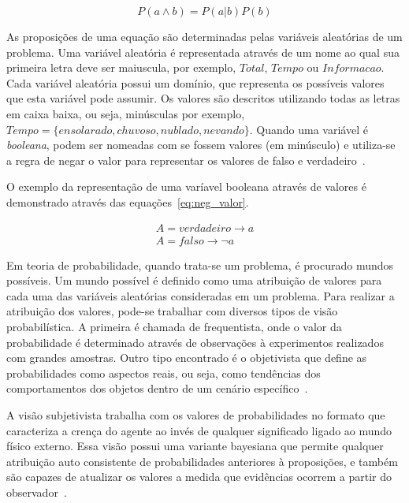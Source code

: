 \begin{equation}
    \label{eq:prob_condicional_a_b_2}
    P(a \land b) = P(a|b)P(b)
\end{equation}

As proposições de uma equação são determinadas pelas variáveis aleatórias de um problema. Uma variável aleatória é representada através de um nome ao qual sua primeira letra deve ser maiuscula, por exemplo, $Total$, $Tempo$ ou $Informacao$. Cada variável aleatória possui um domínio, que representa os possíveis valores que esta variável pode assumir. Os valores são descritos utilizando todas as letras em caixa baixa, ou seja, minúsculas por exemplo, $Tempo = \{ ensolarado, chuvoso, nublado, nevando \}$. Quando uma variável é \emph{booleana}, podem ser nomeadas com se fossem valores (em minúsculo) e utiliza-se a regra de negar o valor para representar os valores de falso e verdadeiro~\cite{russell:2002}.

O exemplo da representação de uma varíavel booleana através de valores é demonstrado através das equações~\ref{eq:neg_valor}.

\begin{subequations}
    \label{eq:neg_valor}
    \begin{align}
        A = verdadeiro \rightarrow a\\
        A = falso \rightarrow \neg a
    \end{align}
\end{subequations}

Em teoria de probabilidade, quando trata-se um problema, é procurado mundos possíveis. Um mundo possível é definido como uma atribuição de valores para cada uma das variáveis aleatórias consideradas em um problema. Para realizar a atribuição dos valores, pode-se trabalhar com diversos tipos de visão probabilística. A primeira é chamada de frequentista, onde o valor da probabilidade é determinado através de observações à experimentos realizados com grandes amostras. Outro tipo encontrado é o objetivista que define as probabilidades como aspectos reais, ou seja, como tendências dos comportamentos dos objetos dentro de um cenário específico~\cite{russell:2002, faceli:2011}.

A visão subjetivista trabalha com os valores de probabilidades no formato que caracteriza a crença do agente ao invés de qualquer significado ligado ao mundo físico externo. Essa visão possui uma variante bayesiana que permite qualquer atribuição auto consistente de probabilidades anteriores à proposições, e também são capazes de atualizar os valores a medida que evidências ocorrem a partir do observador~\cite{russell:2002}.

